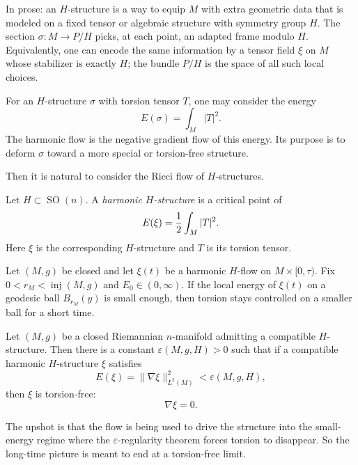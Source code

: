 In prose: an $H$-structure is a way to
equip $M$ with extra geometric
data that is modeled on a fixed tensor
or algebraic structure with symmetry
group $H$.
The section
$\sigma:M\to P/H$ picks, at each point,
an adapted frame modulo $H$.
Equivalently, one can encode the same
information by a tensor field
$\xi$ on $M$ whose stabilizer is
exactly $H$; the bundle $P/H$ is the
space of all such local choices.

\begin{example}
\label{example-harmonic-flow2}
For an $H$-structure $\sigma$ with
torsion tensor $T$, one may consider
the energy
$$
        E(\sigma)=\int_M |T|^2 .
$$
The harmonic flow is the negative
gradient flow of this energy.
Its purpose is to deform $\sigma$
toward a more special or torsion-free
structure.

Then it is natural to consider the
Ricci flow of $H$-structures.
\end{example}

\begin{definition}
\label{definition-harmonic-h}
Let $H\subset \operatorname{SO}(n)$.
A {\it harmonic $H$-structure} is a
critical point of
$$
        E(\xi)
        =
        {1\over 2}
        \int_M |T|^2 .
$$
Here $\xi$ is the corresponding
$H$-structure and $T$ is its torsion
tensor.
\end{definition}

\begin{theorem}
\label{theorem-epsilon-regularity2}
Let $(M,g)$ be closed and let
$\xi(t)$ be a harmonic $H$-flow on
$M\times[0,\tau)$.
Fix $0<r_M<\operatorname{inj}(M,g)$ and
$E_0\in(0,\infty)$.
If the local energy of $\xi(t)$ on a
geodesic ball $B_{r_M}(y)$ is small
enough, then torsion stays controlled
on a smaller ball for a short time.
\end{theorem}

\begin{theorem}
\label{theorem-energy-gap2}
Let $(M,g)$ be a closed Riemannian
$n$-manifold admitting a compatible
$H$-structure.
Then there is a constant
$\varepsilon(M,g,H)>0$ such that if a
compatible harmonic $H$-structure
$\xi$ satisfies
$$
        E(\xi)
        =
        \|\nabla \xi\|_{L^2(M)}^2
        <
        \varepsilon(M,g,H),
$$
then $\xi$ is torsion-free:
$$
        \nabla \xi = 0.
$$
\end{theorem}

The upshot is that the flow is being
used to drive the structure into the
small-energy regime where the
$\varepsilon$-regularity theorem
forces torsion to disappear.
So the long-time picture is meant to
end at a torsion-free limit.

